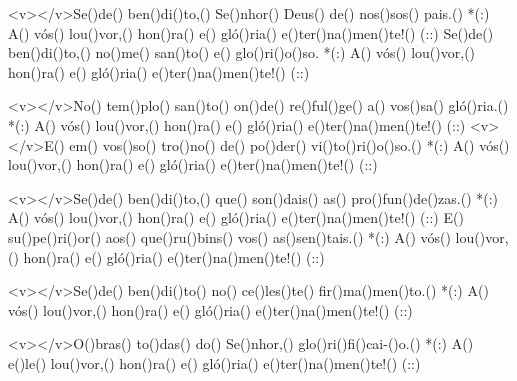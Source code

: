 <v></v>Se()de() ben()di()to,() Se()nhor() Deus() de() nos()sos() pais.() *(:)
A() vós() lou()vor,() hon()ra() e() gló()ria() e()ter()na()men()te!() (::)
Se()de() ben()di()to,() no()me() san()to() e() glo()ri()o()so. *(:)
A() vós() lou()vor,() hon()ra() e() gló()ria() e()ter()na()men()te!() (::)

<v></v>No() tem()plo() san()to() on()de() re()ful()ge() a() vos()sa() gló()ria.() *(:)
A() vós() lou()vor,() hon()ra() e() gló()ria() e()ter()na()men()te!() (::)
<v></v>E() em() vos()so() tro()no() de() po()der() vi()to()ri()o()so.() *(:)
A() vós() lou()vor,() hon()ra() e() gló()ria() e()ter()na()men()te!() (::)

<v></v>Se()de() ben()di()to,() que() son()dais() as() pro()fun()de()zas.() *(:)
A() vós() lou()vor,() hon()ra() e() gló()ria() e()ter()na()men()te!() (::)
E() su()pe()ri()or() aos() que()ru()bins() vos() as()sen()tais.() *(:)
A() vós() lou()vor,() hon()ra() e() gló()ria() e()ter()na()men()te!() (::)

<v></v>Se()de() ben()di()to() no() ce()les()te() fir()ma()men()to.() *(:)
A() vós() lou()vor,() hon()ra() e() gló()ria() e()ter()na()men()te!() (::)

<v></v>O()bras() to()das() do() Se()nhor,() glo()ri()fi()cai-()o.() *(:)
A() e()le() lou()vor,() hon()ra() e() gló()ria() e()ter()na()men()te!() (::)